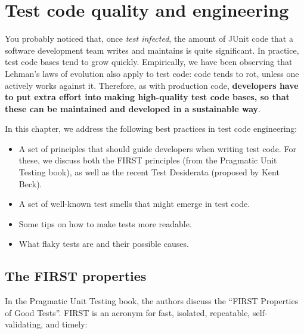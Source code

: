 \hypertarget{test-code-quality-and-engineering}{%
\section{Test code quality and
engineering}\label{test-code-quality-and-engineering}}

You probably noticed that, once \emph{test infected}, the amount of
JUnit code that a software development team writes and maintains is
quite significant. In practice, test code bases tend to grow quickly.
Empirically, we have been observing that Lehman's laws of evolution also
apply to test code: code tends to rot, unless one actively works against
it. Therefore, as with production code, \textbf{developers have to put
extra effort into making high-quality test code bases, so that these can
be maintained and developed in a sustainable way}.

In this chapter, we address the following best practices in test code
engineering:

\begin{itemize}
\tightlist
\item
  A set of principles that should guide developers when writing test
  code. For these, we discuss both the FIRST principles (from the
  Pragmatic Unit Testing book), as well as the recent Test Desiderata
  (proposed by Kent Beck).
\item
  A set of well-known test smells that might emerge in test code.
\item
  Some tips on how to make tests more readable.
\item
  What flaky tests are and their possible causes.
\end{itemize}

\hypertarget{the-first-properties}{%
\subsection{The FIRST properties}\label{the-first-properties}}

In the Pragmatic Unit Testing book, the authors discuss the ``FIRST
Properties of Good Tests''. FIRST is an acronym for fast, isolated,
repeatable, self-validating, and timely:

